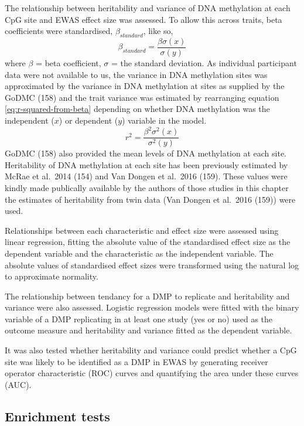 \documentclass[11pt,oneside]{bristolthesis}
\begin{document}
The relationship between heritability and variance of DNA methylation at each CpG site and EWAS effect size was assessed. To allow this across traits, beta coefficients were standardised, \(\beta_{standard}\), like so,
\begin{equation}
    \beta_{standard} = \frac{\beta\sigma(x)} {\sigma(y)}
    \label{eq:standardised-beta-coeffs}
\end{equation}
where \(\beta\) = beta coefficient, \(\sigma\) = the standard deviation. As individual participant data were not available to us, the variance in DNA methylation sites was approximated by the variance in DNA methylation at sites as supplied by the GoDMC (158) and the trait variance was estimated by rearranging equation \eqref{eq:r-squared-from-beta} depending on whether DNA methylation was the independent (\(x\)) or dependent (\(y\)) variable in the model.
\begin{equation}
    r^2 = \frac{\beta^2\sigma^2(x)} {\sigma^2(y)}
    \label{eq:r-squared-from-beta}
\end{equation}
GoDMC (158) also provided the mean levels of DNA methylation at each site. Heritability of DNA methylation at each site has been previously estimated by McRae et al.~2014 (154) and Van Dongen et al.~2016 (159). These values were kindly made publically available by the authors of those studies in this chapter the estimates of heritability from twin data (Van Dongen et al.~2016 (159)) were used.

Relationships between each characteristic and effect size were assessed using linear regression, fitting the absolute value of the standardised effect size as the dependent variable and the characteristic as the independent variable. The absolute values of standardised effect sizes were transformed using the natural log to approximate normality.

The relationship between tendancy for a DMP to replicate and heritability and variance were also assessed. Logistic regression models were fitted with the binary variable of a DMP replicating in at least one study (yes or no) used as the outcome measure and heritability and variance fitted as the dependent variable.

It was also tested whether heritability and variance could predict whether a CpG site was likely to be identified as a DMP in EWAS by generating receiver operator characteristic (ROC) curves and quantifying the area under these curves (AUC).

\hypertarget{enrichment-tests-04}{%
\subsection{Enrichment tests}\label{enrichment-tests-04}}
\end{document}
